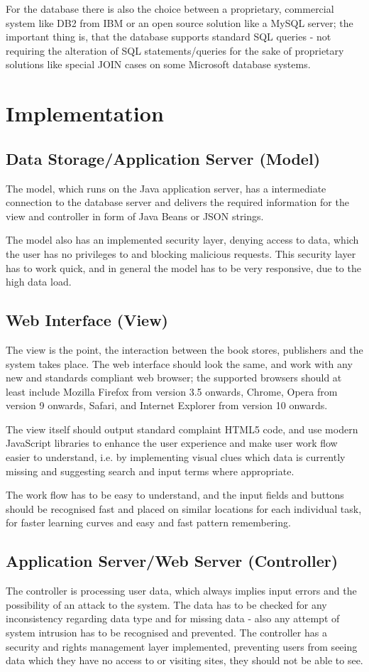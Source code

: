 \documentclass[11pt,a4paper,oneside,svgnames]{report}
\begin{document}
For the database there is also the choice between a proprietary, commercial system like DB2 from IBM or an open source solution like a MySQL server; the important thing is, that the database supports standard SQL queries - not requiring the alteration of SQL statements/queries for the sake of proprietary solutions like special JOIN cases on some Microsoft database systems.

\section{Implementation}
\subsection{Data Storage/Application Server (Model)}
The model, which runs on the Java application server, has a intermediate connection to the database server and delivers the required information for the view and controller in form of Java Beans or JSON strings.

The model also has an implemented security layer, denying access to data, which the user has no privileges to and blocking malicious requests. This security layer has to work quick, and in general the model has to be very responsive, due to the high data load.

\subsection{Web Interface (View)}
The view is the point, the interaction between the book stores, publishers and the system takes place. The web interface should look the same, and work with any new and standards compliant web browser; the supported browsers should at least include Mozilla Firefox from version 3.5 onwards, Chrome, Opera from version 9 onwards, Safari, and Internet Explorer from version 10 onwards.

The view itself should output standard complaint HTML5 code, and use modern JavaScript libraries to enhance the user experience and make user work flow easier to understand, i.e. by implementing visual clues which data is currently missing and suggesting search and input terms where appropriate.

The work flow has to be easy to understand, and the input fields and buttons should be recognised fast and placed on similar locations for each individual task, for faster learning curves and easy and fast pattern remembering.

\subsection{Application Server/Web Server (Controller)}
The controller is processing user data, which always implies input errors and the possibility of an attack to the system. The data has to be checked for any inconsistency regarding data type and for missing data - also any attempt of system intrusion has to be recognised and prevented.
The controller has a security and rights management layer implemented, preventing users from seeing data which they have no access to or visiting sites, they should not be able to see.
\end{document}
